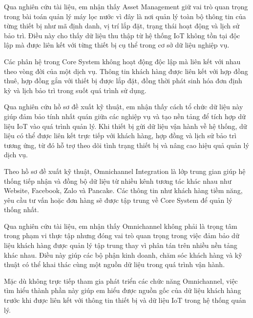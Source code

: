 Qua nghiên cứu tài liệu, em nhận thấy Asset Management giữ vai trò quan trọng trong bài toán quản lý máy lọc nước vì đây là nơi quản lý toàn bộ thông tin của từng thiết bị như mã định danh, vị trí lắp đặt, trạng thái hoạt động và lịch sử bảo trì. Điều này cho thấy dữ liệu thu thập từ hệ thống IoT không tồn tại độc lập mà được liên kết với từng thiết bị cụ thể trong cơ sở dữ liệu nghiệp vụ.


Các phân hệ trong Core System không hoạt động độc lập mà liên kết với nhau theo vòng đời của một dịch vụ. Thông tin khách hàng được liên kết với hợp đồng thuê, hợp đồng gắn với thiết bị được lắp đặt, đồng thời phát sinh hóa đơn định kỳ và lịch bảo trì trong suốt quá trình sử dụng.

Qua nghiên cứu hồ sơ đề xuất kỹ thuật, em nhận thấy cách tổ chức dữ liệu này giúp đảm bảo tính nhất quán giữa các nghiệp vụ và tạo nền tảng để tích hợp dữ liệu IoT vào quá trình quản lý. Khi thiết bị gửi dữ liệu vận hành về hệ thống, dữ liệu có thể được liên kết trực tiếp với khách hàng, hợp đồng và lịch sử bảo trì tương ứng, từ đó hỗ trợ theo dõi tình trạng thiết bị và nâng cao hiệu quả quản lý dịch vụ.


Theo hồ sơ đề xuất kỹ thuật, Omnichannel Integration là lớp trung gian giúp hệ thống tiếp nhận và đồng bộ dữ liệu từ nhiều kênh tương tác khác nhau như Website, Facebook, Zalo và Pancake. Các thông tin như khách hàng tiềm năng, yêu cầu tư vấn hoặc đơn hàng sẽ được tập trung về Core System để quản lý thống nhất.

Qua nghiên cứu tài liệu, em nhận thấy Omnichannel không phải là trọng tâm trong phạm vi thực tập nhưng đóng vai trò quan trọng trong việc đảm bảo dữ liệu khách hàng được quản lý tập trung thay vì phân tán trên nhiều nền tảng khác nhau. Điều này giúp các bộ phận kinh doanh, chăm sóc khách hàng và kỹ thuật có thể khai thác cùng một nguồn dữ liệu trong quá trình vận hành.


Mặc dù không trực tiếp tham gia phát triển các chức năng Omnichannel, việc tìm hiểu thành phần này giúp em hiểu được nguồn gốc của dữ liệu khách hàng trước khi được liên kết với thông tin thiết bị và dữ liệu IoT trong hệ thống quản lý.


